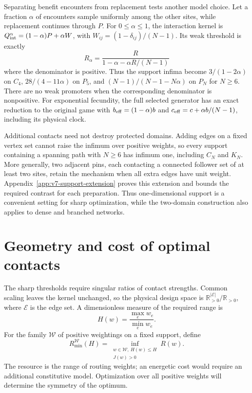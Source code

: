 \documentclass[aps,pre,reprint,amsmath,amssymb,longbibliography]{revtex4-2}
\begin{document}
Separating benefit encounters from replacement tests another model
choice. Let a fraction $\alpha$ of encounters sample uniformly among
the other sites, while replacement continues through $P$. For $0\le\alpha\le1$, the
interaction kernel is
$Q_{\rm int}^{\alpha}=(1-\alpha)P+\alpha W$, with
$W_{ij}=(1-\delta_{ij})/(N-1)$. Its weak threshold is exactly
\begin{equation}
 R_\alpha=\frac{R}{1-\alpha-\alpha R/(N-1)}
 \label{eq:v7-encounter-map-main}
\end{equation}
where the denominator is positive. Thus the support infima become
$3/(1-2\alpha)$ on $C_4$, $28/(4-11\alpha)$ on $P_5$, and
$(N-1)/(N-1-N\alpha)$ on $P_N$ for $N\ge6$.
There are no weak promoters when the corresponding denominator is
nonpositive. For exponential fecundity, the full selected generator
has an exact reduction to the original game with
$b_{\rm eff}=(1-\alpha)b$ and
$c_{\rm eff}=c+\alpha b/(N-1)$, including its physical clock.

Additional contacts need not destroy protected domains. Adding edges
on a fixed vertex set cannot raise the infimum over positive weights,
so every support containing a spanning path with $N\ge6$ has
infimum one, including $C_N$ and $K_N$. More generally, two adjacent
pins, each contacting a connected follower set of at least two sites,
retain the mechanism when all extra edges have unit weight. Appendix~\ref{app:v7-support-extension} proves this extension and
bounds the required contrast for each preparation. Thus one-dimensional
support is a convenient setting for sharp optimization, while the
two-domain construction also applies to dense and branched networks.


\section{Geometry and cost of optimal contacts}
\label{sec:cost}
The sharp thresholds require singular ratios of contact strengths.
Common scaling leaves the kernel unchanged, so the physical design
space is $\mathbb R_{>0}^{|\mathcal E|}/\mathbb R_{>0}$, where $\mathcal E$ is the edge set. A dimensionless measure
of the required range is
\begin{equation}
 H(w)=\frac{\max_e w_e}{\min_e w_e}.
 \label{eq:contrast}
\end{equation}
For the family $\mathcal W$ of positive weightings on a fixed support, define
\begin{equation}
 R_{\min}^{\mathcal W}(H)=
 \inf_{\substack{w\in\mathcal W,\ H(w)\le H\\J(w)>0}}R(w).
 \label{eq:constrained-threshold}
\end{equation}
The resource is the range of routing weights; an energetic cost would
require an additional constitutive model. Optimization over all positive
weights will determine the symmetry of the optimum.
\end{document}

